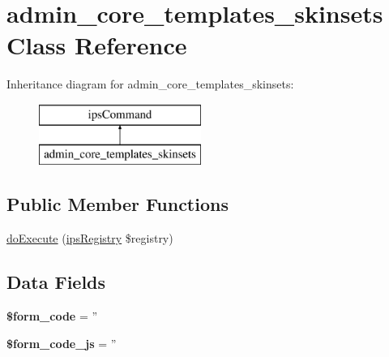 \hypertarget{classadmin__core__templates__skinsets}{\section{admin\-\_\-core\-\_\-templates\-\_\-skinsets Class Reference}
\label{classadmin__core__templates__skinsets}
}
Inheritance diagram for admin\-\_\-core\-\_\-templates\-\_\-skinsets\-:\begin{figure}[H]
\begin{center}
\leavevmode
\includegraphics[height=2.000000cm]{classadmin__core__templates__skinsets}
\end{center}
\end{figure}
\subsection*{Public Member Functions}
\begin{DoxyCompactItemize}
\item 
\hyperlink{classadmin__core__templates__skinsets_afbc4e912a0604b94d47d66744c64d8ba}{do\-Execute} (\hyperlink{classips_registry}{ips\-Registry} \$registry)
\end{DoxyCompactItemize}
\subsection*{Data Fields}
\begin{DoxyCompactItemize}
\item 
\hypertarget{classadmin__core__templates__skinsets_af28aee726fa3eb6c355d08a2ab655e03}{{\bfseries \$form\-\_\-code} = ''}\label{classadmin__core__templates__skinsets_af28aee726fa3eb6c355d08a2ab655e03}

\item 
\hypertarget{classadmin__core__templates__skinsets_ac68fe8a02a2efd63c3271179f4b4fbb7}{{\bfseries \$form\-\_\-code\-\_\-js} = ''}\label{classadmin__core__templates__skinsets_ac68fe8a02a2efd63c3271179f4b4fbb7}

\end{DoxyCompactItemize}
